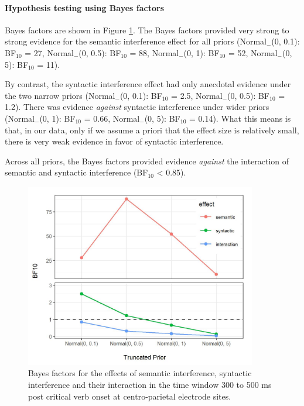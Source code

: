 \documentclass[a4paper, man, floatsintext]{apa7}
\begin{document}
\paragraph{Hypothesis testing using Bayes factors}

Bayes factors are shown in Figure \ref{fig:eeg_bfs}. The Bayes factors provided very strong to strong evidence for the semantic interference effect for all priors 
(Normal$_{-}$(0, 0.1): BF$_{10}$ = 27,
Normal$_{-}$(0, 0.5): BF$_{10}$ = 88,
Normal$_{-}$(0, 1): BF$_{10}$ = 52,
Normal$_{-}$(0, 5): BF$_{10}$ = 11). 

By contrast, the syntactic interference effect had only anecdotal evidence  under the two narrow priors (Normal$_{-}$(0, 0.1): BF$_{10}$ = 2.5,
Normal$_{-}$(0, 0.5): BF$_{10}$ = 1.2). There was evidence \textit{against} syntactic interference under wider priors 
(Normal$_{-}$(0, 1): BF$_{10}$ = 0.66,
Normal$_{-}$(0, 5): BF$_{10}$ = 0.14).  What this means is that, in our data, only if we assume a priori that the effect size is relatively small, there is very weak evidence in favor of syntactic interference.

Across all priors, the Bayes factors provided evidence \textit{against} the interaction of semantic and syntactic interference (BF$_{10}$ < 0.85).


\begin{figure}
    \caption{Bayes factors for the effects of semantic interference, syntactic interference and their interaction in the time window 300 to 500 ms post critical verb onset at centro-parietal electrode sites.}
    \label{fig:eeg_bfs}
    \centering
    \includegraphics[width=0.9\textwidth]{images/BF_plot_N103_cp_300_500.jpg}
\end{figure}
\end{document}
